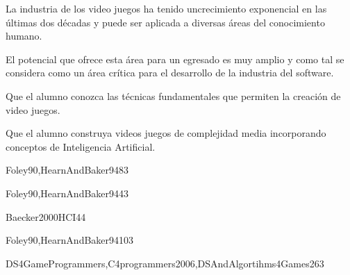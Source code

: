 \begin{syllabus}


\begin{justification}
La industria de los video juegos ha tenido uncrecimiento exponencial en las últimas dos décadas y puede ser aplicada a 
diversas áreas del conocimiento humano.

El potencial que ofrece esta área para un egresado es muy amplio y como tal se considera como un área crítica para el 
desarrollo de la industria del software.
\end{justification}

\begin{goals}
\item Que el alumno conozca las técnicas fundamentales que permiten la creación de video juegos.
\item Que el alumno construya videos juegos de complejidad media incorporando conceptos de Inteligencia Artificial.
\end{goals}

\begin{outcomes}
\end{outcomes}

\begin{unit}{\GVAdvancedTechniquesDef}{Foley90,HearnAndBaker94}{8}{3}
        \GVAdvancedTechniquesAllTopics
        \GVAdvancedTechniquesAllObjectives
\end{unit}

\begin{unit}{\GVVisualizationDef}{Foley90,HearnAndBaker94}{4}{3}
        \GVVisualizationAllTopics
        \GVVisualizationAllObjectives
\end{unit}

\begin{unit}{\HCFoundationsDef}{Baecker2000HCI}{4}{4}
    \HCFoundationsAllTopics
    \HCFoundationsAllObjectives
\end{unit}

\begin{unit}{\GVAdvancedRenderingDef}{Foley90,HearnAndBaker94}{10}{3}
        \GVAdvancedRenderingAllTopics
        \GVAdvancedRenderingAllObjectives
\end{unit}

\begin{unit}{\GVGameEngineProgrammingDef}{DS4GameProgrammers,C4programmers2006,DSAndAlgortihms4Games}{26}{3}
    \GVGameEngineProgrammingAllTopics
    \GVGameEngineProgrammingAllObjectives
\end{unit}



\begin{coursebibliography}
\end{coursebibliography}

\end{syllabus}

